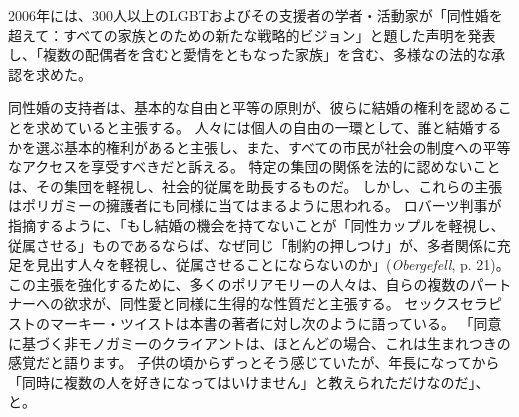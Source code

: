 \documentclass[paper=a4,book,openany]{jlreq}
\newcommand{\ig}[1]{}           %
\begin{document}
2006年には、300人以上のLGBTおよびその支援者の学者・活動家が「同性婚を超えて：すべての家族とのための新たな戦略的ビジョン」と題した声明を発表し、「複数の配偶者を含むと愛情をともなった家族」を含む、多様なの法的な承認を求めた\citep{MR06:_beyon_same_sex_marriag}。

同性婚の支持者は、基本的な自由と平等の原則が、彼らに結婚の権利を認めることを求めていると主張する。
人々には個人の自由の一環として、誰と結婚するかを選ぶ基本的権利があると主張し、また、すべての市民が社会の制度への平等なアクセスを享受すべきだと訴える。
特定の集団の関係を法的に認めないことは、その集団を軽視し、社会的従属を助長するものだ。
しかし、これらの主張はポリガミーの擁護者にも同様に当てはまるように思われる。
ロバーツ判事\ig{John Roberts}が指摘するように、「もし結婚の機会を持てないことが「同性カップルを軽視し、従属させる」ものであるならば、なぜ同じ「制約の押しつけ」が、多者関係に充足を見出す人々を軽視し、従属させることにならないのか」(\emph{Obergefell}, p. 21)。
この主張を強化するために、多くのポリアモリーの人々は、自らの複数のパートナーへの欲求が、同性愛と同様に生得的な性質だと主張する。
セックスセラピストのマーキー・ツイストは本書の著者に対し次のように語っている。
「同意に基づく非モノガミーのクライアントは、ほとんどの場合、これは生まれつきの感覚だと語ります。
子供の頃からずっとそう感じていたが、年長になってから「同時に複数の人を好きになってはいけません」と教えられただけなのだ」、と\citep{mcarthur16:_why_peopl_are_fight_get}。
\end{document}
